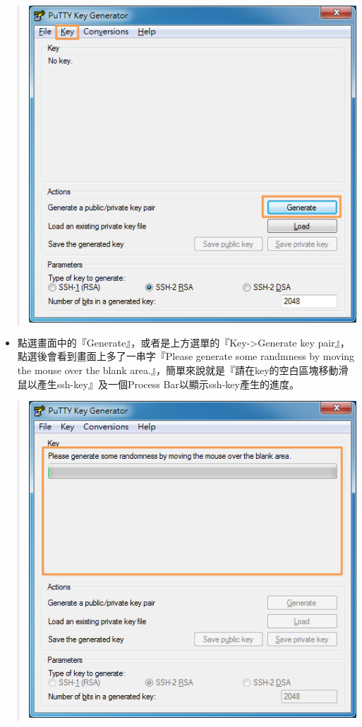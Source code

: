 \documentclass[letterpaper,10pt,english]{sphinxmanual}
\begin{document}
\begin{quote}

\includegraphics{puttygen-002.png}
\end{quote}
\begin{itemize}
\item {} 
點選畫面中的『Generate』，或者是上方選單的『Key-\textgreater{}Generate key pair』，點選後會看到畫面上多了一串字『Please generate some randmness by moving the mouse over the blank area.』，簡單來說就是『請在key的空白區塊移動滑鼠以產生ssh-key』及一個Process Bar以顯示ssh-key產生的進度。

\end{itemize}
\begin{quote}

\includegraphics{puttygen-003.png}
\end{quote}
\end{document}
